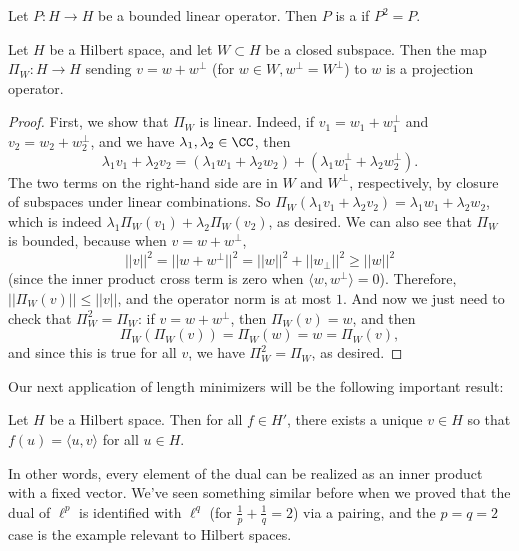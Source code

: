 \begin{definition}
Let $P: H \to H$ be a bounded linear operator. Then $P$ is a  if $P^2 = P$.
\end{definition}

\begin{proposition}
Let $H$ be a Hilbert space, and let $W \subset H$ be a closed subspace. Then the map $\Pi_W: H \to H$ sending $v = w + w^\perp$ (for $w \in W, w^\perp = W^\perp$) to $w$ is a projection operator.
\end{proposition}
\begin{proof}
First, we show that $\Pi_W$ is linear. Indeed, if $v_1 = w_1 + w_1^\perp$ and $v_2 = w_2 + w_2^\perp$, and we have $\lambda_1, \lambda_2 \in \CC$, then 
\[
    \lambda_1 v_1 + \lambda_2 v_2 = (\lambda_1 w_1 + \lambda_2 w_2) + (\lambda_1 w_1^\perp + \lambda_2 w_2^\perp).
\]
The two terms on the right-hand side are in $W$ and $W^\perp$, respectively, by closure of subspaces under linear combinations. So $\Pi_W(\lambda_1 v_1 + \lambda_2 v_2) = \lambda_1 w_1 + \lambda_2 w_2$, which is indeed $\lambda_1 \Pi_W(v_1) + \lambda_2 \Pi_W(v_2)$, as desired. We can also see that $\Pi_W$ is bounded, because when $v = w + w^\perp$, 
\[
    ||v||^2 = ||w + w^\perp||^2 = ||w||^2 + ||w_\perp||^2 \ge ||w||^2
\]
(since the inner product cross term is zero when $\langle w, w^\perp \rangle = 0$). Therefore, $||\Pi_W(v)|| \le ||v||$, and the operator norm is at most $1$. And now we just need to check that $\Pi_W^2 = \Pi_W$: if $v = w + w^\perp$, then $\Pi_W(v) = w$, and then 
\[
    \Pi_W(\Pi_W(v)) = \Pi_W(w) = w = \Pi_W(v),
\]
and since this is true for all $v$, we have $\Pi_W^2 = \Pi_W$, as desired.
\end{proof}

Our next application of length minimizers will be the following important result:

\begin{theorem}
Let $H$ be a Hilbert space. Then for all $f \in H'$, there exists a unique $v \in H$ so that $f(u) = \langle u, v \rangle$ for all $u \in H$. 
\end{theorem}

In other words, every element of the dual can be realized as an inner product with a fixed vector. We've seen something similar before when we proved that the dual of $\ell^p$ is identified with $\ell^q$ (for $\frac{1}{p} + \frac{1}{q} = 2$) via a pairing, and the $p = q = 2$ case is the example relevant to Hilbert spaces.

